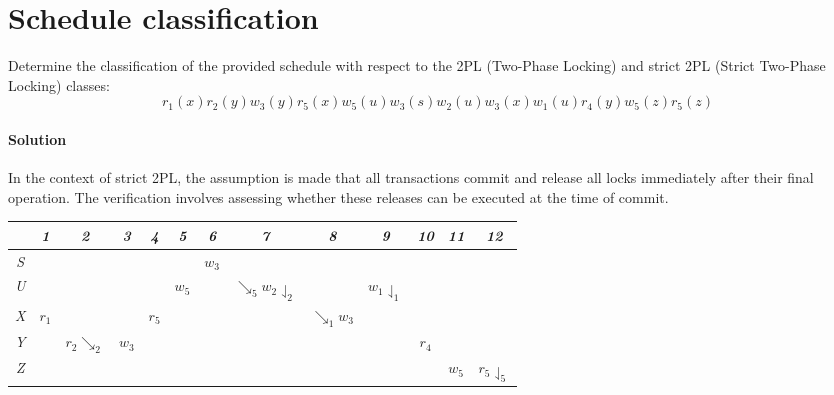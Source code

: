 \section{Schedule classification}

Determine the classification of the provided schedule with respect to the 2PL (Two-Phase Locking) and strict 2PL (Strict Two-Phase Locking) classes:
\[r_1(x) r_2(y) w_3(y) r_5(x) w_5(u) w_3(s) w_2(u) w_3(x) w_1(u) r_4(y) w_5(z) r_5(z)\]

\paragraph*{Solution}
In the context of strict 2PL, the assumption is made that all transactions commit and release all locks immediately after their final operation. 
The verification involves assessing whether these releases can be executed at the time of commit.
\begin{table}[H]
    \centering
    \begin{tabular}{c|cccccccccccc}
            & \textit{1} & \textit{2}      & \textit{3} & \textit{4} & \textit{5} & \textit{6} & \textit{7}                        & \textit{8}      & \textit{9}              & \textit{10} & \textit{11} & \textit{12}             \\ \hline
    \textit{S} &            &                 &            &            &            & $w_3$      &                                   &                 &                         &             &             &                         \\
    \textit{U} &            &                 &            &            & $w_5$      &            & $\searrow_5w_2\downharpoonleft_2$ &                 & $w_1\downharpoonleft_1$ &             &             &                         \\
    \textit{X} & $r_1$      &                 &            & $r_5$      &            &            &                                   & $\searrow_1w_3$ &                         &             &             &                         \\
    \textit{Y} &            & $r_2\searrow_2$ & $w_3$      &            &            &            &                                   &                 &                         & $r_4$       &             &                         \\
    \textit{Z} &            &                 &            &            &            &            &                                   &                 &                         &             & $w_5$       & $r_5\downharpoonleft_5$
    \end{tabular}
\end{table}
